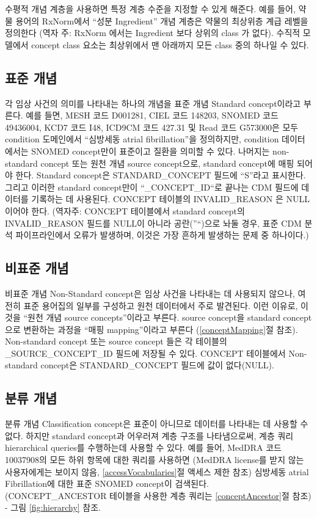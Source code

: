 \documentclass[10.5pt]{book}
\theoremstyle{definition}
\theoremstyle{definition}
\theoremstyle{definition}
\theoremstyle{remark}
\begin{document}
수평적 개념 계층을 사용하면 특정 계층 수준을 지정할 수 있게 해준다. 예를
들어, 약물 용어의 RxNorm에서 ``성분 Ingredient'' 개념 계층은 약물의
최상위층 계급 레벨을 정의한다 (역자 주: RxNorm 에서는 Ingredient 보다
상위의 class 가 없다). 수직적 모델에서 concept class 요소는 최상위에서
맨 아래까지 모든 class 중의 하나일 수 있다.

\subsection{표준 개념}\label{standardConcepts}

각 임상 사건의 의미를 나타내는 하나의 개념을 표준 개념 Standard
concept이라고 부른다. 예를 들면, MESH 코드 D001281, CIEL 코드 148203,
SNOMED 코드 49436004, KCD7 코드 I48, ICD9CM 코드 427.31 및 Read 코드
G573000은 모두 condition 도메인에서 ``심방세동 atrial fibrillation''을
정의하지만, condition 데이터에서는 SNOMED concept만이 표준이고 질환을
의미할 수 있다. 나머지는 non-standard concept 또는 원천 개념 source
concept으로, standard concept에 매핑 되어야 한다. Standard concept은
STANDARD\_CONCEPT 필드에 ``S''라고 표시한다. 그리고 이러한 standard
concept만이 ``\_CONCEPT\_ID``로 끝나는 CDM 필드에 데이터를 기록하는 데
사용된다. CONCEPT 테이블의 INVALID\_REASON 은 NULL이어야 한다. (역자주:
CONCEPT 테이블에서 standard concept의 INVALID\_REASON 필드를 NULL이
아니라 공란(''``)으로 놔둘 경우, 표준 CDM 분석 파이프라인에서 오류가
발생하며, 이것은 가장 흔하게 발생하는 문제 중 하나이다.)

\subsection{비표준 개념}\label{-}

비표준 개념 Non-Standard concept은 임상 사건을 나타내는 데 사용되지
않으나, 여전히 표준 용어집의 일부를 구성하고 원천 데이터에서 주로
발견된다. 이런 이유로, 이것을 ``원천 개념 source concepts''이라고
부른다. source concept을 standard concept으로 변환하는 과정을 ``매핑
mapping''이라고 부른다 (\ref{conceptMapping}절 참조). Non-standard
concept 또는 source concept 들은 각 테이블의 \_SOURCE\_CONCEPT\_ID
필드에 저장될 수 있다. CONCEPT 테이블에서 Non-standard concept은
STANDARD\_CONCEPT 필드에 값이 없다(NULL).

\subsection{분류 개념}\label{-}

분류 개념 Classification concept은 표준이 아니므로 데이터를 나타내는 데
사용할 수 없다. 하지만 standard concept과 어우러져 계층 구조를
나타냄으로써, 계층 쿼리 hierarchical queries를 수행하는데 사용할 수
있다. 예를 들어, MedDRA 코드 10037908의 모든 하위 항목에 대한 쿼리를
사용하면 (MedDRA license를 받지 않는 사용자에게는 보이지 않음,
\ref{accessVocabularies}절 액세스 제한 참조) 심방세동 atrial
Fibrillation에 대한 표준 SNOMED concept이 검색된다. (CONCEPT\_ANCESTOR
테이블을 사용한 계층 쿼리는 \ref{conceptAncestor}절 참조) - 그림
\ref{fig:hierarchy} 참조. 
\end{document}
